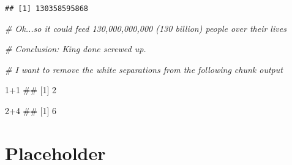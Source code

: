 \documentclass[]{book}
\newenvironment{Shaded}{\begin{snugshade}}{\end{snugshade}}
\newcommand{\DecValTok}[1]{\textcolor[rgb]{0.00,0.00,0.81}{{#1}}}
\newcommand{\CommentTok}[1]{\textcolor[rgb]{0.56,0.35,0.01}{\textit{{#1}}}}
\newcommand{\NormalTok}[1]{{#1}}
\begin{document}
\begin{verbatim}
## [1] 130358595868
\end{verbatim}

\begin{Shaded}
\begin{Highlighting}[]
\CommentTok{# Ok...so it could feed 130,000,000,000 (130 billion) people over their lives}

\CommentTok{# Conclusion: King done screwed up.}
\end{Highlighting}
\end{Shaded}

\begin{Shaded}
\begin{Highlighting}[]
\CommentTok{# I want to remove the white separations from the following chunk output}

\DecValTok{1+1}
\NormalTok{## [1] 2}

\DecValTok{2+4}
\NormalTok{## [1] 6}
\end{Highlighting}
\end{Shaded}

\chapter{Placeholder}\label{placeholder}


\end{document}
